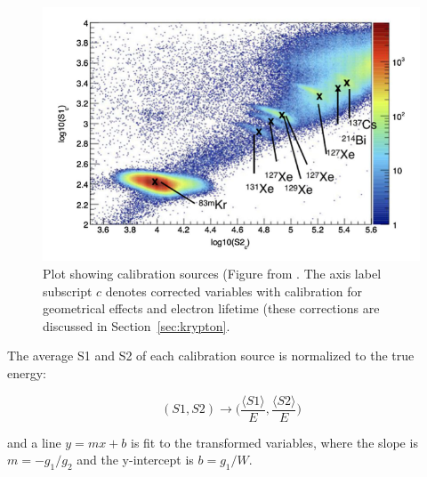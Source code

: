 \begin{figure}[htbp]
\begin{center}
\includegraphics[width=\halffig]{figures/lux/calibration_sources.png}
\caption{Plot showing calibration sources (Figure from \cite{LUX:Run03Comprehensive}. The axis label subscript $c$ denotes corrected variables with calibration for geometrical effects and electron lifetime (these corrections are discussed in Section~\ref{sec:krypton}.}
\label{fig:calib_sources}
\end{center}
\end{figure}

The average S1 and S2 of each calibration source is normalized to the true energy:

\begin{equation}
(S1, S2) \longrightarrow \Big(\frac{\langle S1 \rangle}{E}, \frac{\langle S2 \rangle}{E}\Big)
\end{equation}

and a line $y = mx + b$ is fit to the transformed variables, where the slope is $m = -g_{1} / g_{2}$ and the y-intercept is $b = g_{1} / W$. 


